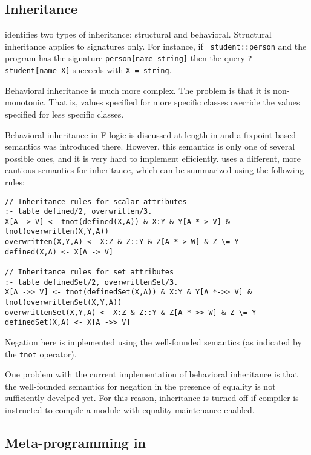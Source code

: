 \documentclass[11pt]{report}
\begin{document}
\subsection{Inheritance}

\fl identifies two types of inheritance: structural and behavioral.
Structural inheritance applies to signatures only. For instance, if {\tt
  student::person} and the program has the signature {\tt person[name \Fd
string]} then the query {\tt ?- student[name \Fd X]} succeeds with {\tt X =
string}.

Behavioral inheritance is much more complex. The problem  is that it is
non-monotonic. That is, values specified for more specific classes override
the values specified for less specific classes.

Behavioral inheritance in F-logic is discussed at length in \cite{KLW95}
and a fixpoint-based semantics was introduced there. However, this
semantics is only one of several possible ones, and it is very hard to
implement efficiently. \FLORA uses a different, more cautious semantics for
inheritance, which can be summarized using the following rules:
\begin{verbatim}
// Inheritance rules for scalar attributes
:- table defined/2, overwritten/3.
X[A -> V] <- tnot(defined(X,A)) & X:Y & Y[A *-> V] & tnot(overwritten(X,Y,A))
overwritten(X,Y,A) <- X:Z & Z::Y & Z[A *-> W] & Z \= Y
defined(X,A) <- X[A -> V]

// Inheritance rules for set attributes
:- table definedSet/2, overwrittenSet/3.
X[A ->> V] <- tnot(definedSet(X,A)) & X:Y & Y[A *->> V] & tnot(overwrittenSet(X,Y,A))
overwrittenSet(X,Y,A) <- X:Z & Z::Y & Z[A *->> W] & Z \= Y
definedSet(X,A) <- X[A ->> V]
\end{verbatim}
Negation here is implemented using the well-founded semantics (as indicated
by the {\tt tnot} operator).

One problem with the current implementation of behavioral inheritance is
that the well-founded semantics for negation in the presence of equality is
not sufficiently develped yet. For this reason, inheritance is turned off
if \FLORA compiler is instructed to compile a \FLORA module with equality
maintenance enabled.

\subsection{Meta-programming in \FLORA}
\end{document}
